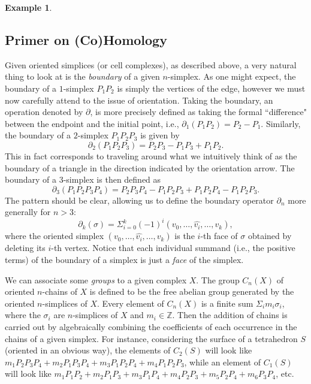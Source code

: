\documentclass[11pt]{book}
\theoremstyle{definition}
\newtheorem{example}{Example}[section]
\theoremstyle{definition}
\theoremstyle{definition}
\theoremstyle{theorem}
\theoremstyle{definition}
\begin{document}
\begin{example}
	\subsection{Primer on (Co)Homology}
	Given oriented simplices (or cell complexes), as described above, a very natural thing to look at is the \textit{boundary} of a given $n$-simplex. As one might expect, the boundary of a $1$-simplex $P_1P_2$ is simply the vertices of the edge, however we must now carefully attend to the issue of orientation. Taking the boundary, an operation denoted by $\partial$, is more precisely defined as taking the formal ``difference" between the endpoint and the initial point, i.e., $\partial_1(P_1P_2) = P_2 - P_1$. Similarly, the boundary of a $2$-simplex $P_1P_2P_3$ is given by 
	\begin{equation*}
	\partial_2(P_1P_2P_3) = P_2P_3 - P_1P_3 + P_1P_2.
	\end{equation*} 
	This in fact corresponds to traveling around what we intuitively think of as the boundary of a triangle in the direction indicated by the orientation arrow. The boundary of a $3$-simplex is then defined as 
	\begin{equation*}
	\partial_3(P_1P_2P_3P_4) = P_2P_3P_4 - P_1P_2P_3 + P_1P_2P_4 - P_1P_2P_3.
	\end{equation*}
	The pattern should be clear, allowing us to define the boundary operator $\partial_n$ more generally for $n > 3$: 
	\begin{equation}
	\partial_k(\sigma) = \Sigma_{i = 0}^k (-1)^i (v_0,\dots,\widehat{v_i},\dots,v_k), 
	\end{equation}
	where the oriented simplex $(v_0,\dots, \widehat{v_i}, \dots, v_k)$ is the $i$-th face of $\sigma$ obtained by deleting its $i$-th vertex. Notice that each individual summand (i.e., the positive terms) of the boundary of a simplex is just a \textit{face} of the simplex. \par  
	We can associate some \textit{groups} to a given complex $X$. The group $C_n(X)$ of oriented $n$-chains of $X$ is defined to be the free abelian group generated by the oriented $n$-simplices of $X$. Every element of $C_n(X)$ is a finite sum $\Sigma_i m_i \sigma_i$, where the $\sigma_i$ are $n$-simplices of $X$ and $m_i \in \mathbb{Z}$. Then the addition of chains is carried out by algebraically combining the coefficients of each occurrence in the chains of a given simplex. For instance, considering the surface of a tetrahedron $S$ (oriented in an obvious way), the elements of $C_2(S)$ will look like $m_1P_2P_3P_4 + m_2P_1P_3P_4 + m_3P_1P_2P_4 + m_4P_1P_2P_3$, while an element of $C_1(S)$ will look like $m_1P_1P_2 + m_2P_1P_3 + m_3P_1P_4 + m_4P_2P_3 + m_5P_2P_4 + m_6P_3P_4$, etc.\par 

\end{example}
\end{document}
